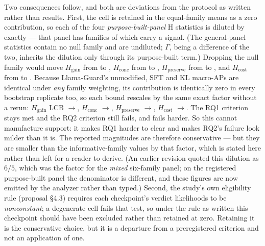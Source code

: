 Two consequences follow, and both are deviations from the protocol as written rather than results.
First, the cell is retained in the equal-family means as a zero contribution, so each of the four
\emph{purpose-built-panel} H statistics is diluted by exactly \AdaNullDilution{} --- that panel has
\AdaNFamiliesPB{} families of which \AdaNFamiliesPBValid{} carry a signal. (The general-panel
statistics contain no null family and are undiluted; $\Gamma$, being a difference of the two, inherits
the dilution only through its purpose-built term.) Dropping the null family
would move $H_{\mathrm{gain}}$ from \AdaHGain{} to \AdaHGainDropNull, $H_{\mathrm{conc}}$ from
\AdaHConc{} to \AdaHConcDropNull, $H_{\mathrm{preserve}}$ from \AdaHPreserve{} to
\AdaHPreserveDropNull, and $H_{\mathrm{cost}}$ from \AdaHCost{} to \AdaHCostDropNull. Because
Llama-Guard's unmodified, SFT and KL macro-APs are identical under \emph{any} family weighting, its
contribution is identically zero in every bootstrap replicate too, so each bound rescales by the same
exact factor without a rerun: $H_{\mathrm{gain}}$ LCB \AdaHGainLCB$\to$\AdaHGainLCBDropNull,
$H_{\mathrm{conc}}$ \AdaHConcLCB$\to$\AdaHConcLCBDropNull, $H_{\mathrm{preserve}}$
\AdaHPreserveLCB$\to$\AdaHPreserveLCBDropNull, $H_{\mathrm{cost}}$
\AdaHCostLCB$\to$\AdaHCostLCBDropNull. The RQ1 criterion stays met and the RQ2 criterion still fails,
and fails harder. So this cannot manufacture support: it makes RQ1 harder to clear and makes RQ2's
failure look milder than it is. The reported magnitudes are therefore conservative --- but they are
smaller than the informative-family values by that factor, which is stated here rather than left for a
reader to derive. (An earlier revision quoted this dilution as $6/5$, which was the factor for the
\emph{mixed} six-family panel; on the registered purpose-built panel the denominator is different, and
these figures are now emitted by the analyzer rather than typed.) Second, the study's
own eligibility rule (proposal \S4.3) requires each checkpoint's verdict likelihoods to be
\emph{nonconstant}; a degenerate cell fails that test, so under the rule as written this checkpoint
should have been excluded rather than retained at zero. Retaining it is the conservative choice, but it
is a departure from a preregistered criterion and not an application of one.

